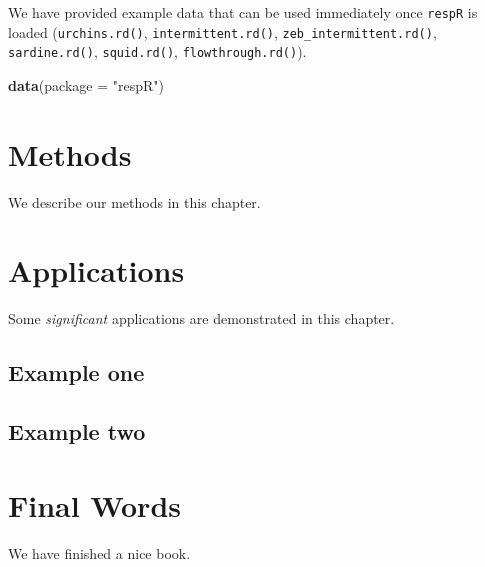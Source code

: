\documentclass[]{book}
\newenvironment{Shaded}{\begin{snugshade}}{\end{snugshade}}
\newcommand{\KeywordTok}[1]{\textcolor[rgb]{0.13,0.29,0.53}{\textbf{#1}}}
\newcommand{\DataTypeTok}[1]{\textcolor[rgb]{0.13,0.29,0.53}{#1}}
\newcommand{\StringTok}[1]{\textcolor[rgb]{0.31,0.60,0.02}{#1}}
\newcommand{\NormalTok}[1]{#1}
\begin{document}
We have provided example data that can be used immediately once
\texttt{respR} is loaded (\texttt{urchins.rd()},
\texttt{intermittent.rd()}, \texttt{zeb\_intermittent.rd()},
\texttt{sardine.rd()}, \texttt{squid.rd()}, \texttt{flowthrough.rd()}).

\begin{Shaded}
\begin{Highlighting}[]
\KeywordTok{data}\NormalTok{(}\DataTypeTok{package =} \StringTok{"respR"}\NormalTok{)}
\end{Highlighting}
\end{Shaded}

\chapter{Methods}\label{methods}

We describe our methods in this chapter.

\chapter{Applications}\label{applications}

Some \emph{significant} applications are demonstrated in this chapter.

\section{Example one}\label{example-one}

\section{Example two}\label{example-two}

\chapter{Final Words}\label{final-words}

We have finished a nice book.


\end{document}
